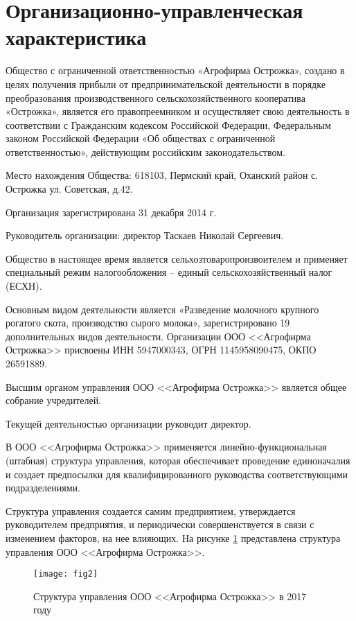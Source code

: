 \section{Организационно-управленческая характеристика}

Общество с ограниченной ответственностью «Агрофирма Острожка», создано в целях получения прибыли от предпринимательской деятельности в порядке преобразования производственного сельскохозяйственного кооператива «Острожка», является его правопреемником и осуществляет свою деятельность в соответствии с Гражданским кодексом Российской Федерации, Федеральным законом Российской Федерации «Об обществах с ограниченной ответственностью», действующим российским законодательством.

Место нахождения Общества: 618103, Пермский край, Оханский район с. Острожка ул. Советская, д.42.

Организация зарегистрирована 31 декабря 2014 г.

Руководитель организации: директор Таскаев Николай Сергеевич.

Общество в настоящее время является сельхозтоваропроизвоителем и применяет специальный режим налогообложения – единый сельскохозяйственный налог (ЕСХН).

Основным видом деятельности является «Разведение молочного крупного рогатого скота, производство сырого молока», зарегистрировано 19 дополнительных видов деятельности. Организации ООО <<Агрофирма Острожка>> присвоены ИНН 5947000343, ОГРН 1145958090475, ОКПО 26591889.

Высшим органом управления ООО <<Агрофирма Острожка>> является общее собрание учредителей.

Текущей деятельностью организации руководит директор.

В ООО <<Агрофирма Острожка>> применяется линейно-функциональная (штабная) структура управления, которая обеспечивает проведение единоначалия и создает предпосылки для квалифицированного руководства соответствующими подразделениями.

Структура управления создается самим предприятием, утверждается руководителем предприятия, и периодически совершенствуется в связи с изменением факторов, на нее влияющих.
На рисунке \ref{fig:fig1} представлена структура управления ООО <<Агрофирма Острожка>>.

\begin{figure}[!h]
	\centering
	\texttt{[image: fig2]}
	\caption{Структура управления ООО <<Агрофирма Острожка>> в 2017 году}
	\label{fig:fig1}
\end{figure}
















































